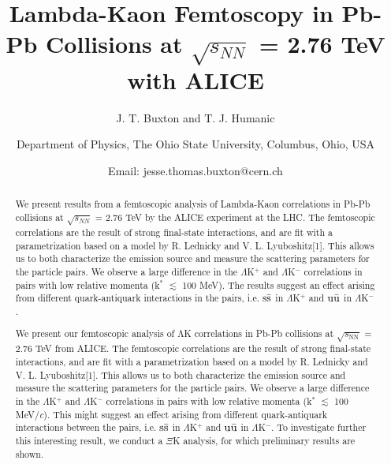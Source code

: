 \documentclass[ALICE,manyauthors]{ALICE_analysis_notes}
\begin{document}
%
%
%
\begin{titlepage}
%
\PHnumber{} 
\PHdate{\today}

 \pagestyle{empty}
 \begin{landscape}

%
\title{Lambda-Kaon Femtoscopy in Pb-Pb Collisions at $\sqrt{s_{NN}}$ = 2.76 TeV with ALICE}
%
\author{J. T. Buxton and T. J. Humanic}
\author{
Department of Physics, The Ohio State University, Columbus, Ohio, USA\\
}
\author{Email: jesse.thomas.buxton@cern.ch}
\begin{abstract}
We present results from a femtoscopic analysis of Lambda-Kaon correlations in Pb-Pb collisions at $\sqrt{s_{NN}}$ = 2.76 TeV by the ALICE experiment at the LHC.
The femtoscopic correlations are the result of strong final-state interactions, and are fit with a parametrization based on a model by R. Lednicky and V. L. Lyuboshitz[1].
This allows us to both characterize the emission source and measure the scattering parameters for the particle pairs.
We observe a large difference in the $\Lambda$K$^{+}$ and $\Lambda$K$^{-}$ correlations in pairs with low relative momenta (k$^{*}$ $\lesssim$ 100 MeV).
The results suggest an effect arising from different quark-antiquark interactions in the pairs, i.e. $\rm s\bar{s}$ in $\Lambda$K$^{+}$ and $\rm u\bar{u}$ in $\Lambda$K$^{-}$.

\clearpage
We present our femtoscopic analysis of $\mathrm{\Lambda}$K correlations in Pb-Pb collisions at $\sqrt{s_{\mathrm{NN}}}$ = 2.76 TeV from ALICE.
The femtoscopic correlations are the result of strong final-state interactions, and are fit with a parametrization based on a model by R. Lednicky and V. L. Lyuboshitz[1].
This allows us to both characterize the emission source and measure the scattering parameters for the particle pairs.
We observe a large difference in the $\Lambda$K$^{+}$ and $\Lambda$K$^{-}$ correlations in pairs with low relative momenta (k$^{*}$ $\lesssim$ 100 MeV/\textit{c}).
This might suggest an effect arising from different quark-antiquark interactions between the pairs, i.e. $\rm s\bar{s}$ in $\Lambda$K$^{+}$ and $\rm u\bar{u}$ in $\Lambda$K$^{-}$.
To investigate further this interesting result, we conduct a $\Xi$K analysis, for which preliminary results are shown.



\end{abstract}
\end{landscape}
\end{titlepage}
\end{document}
